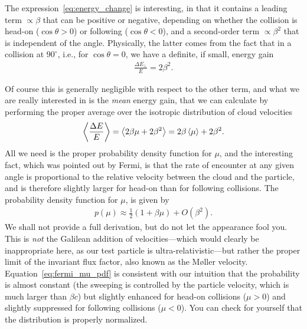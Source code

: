 The expression~\eqref{eq:energy_change} is interesting, in that it contains a leading
term $\propto \beta$ that can be positive or negative, depending on whether the
collision is head-on ($\cos\theta > 0$) or following ($\cos\theta < 0$), and a
second-order term $\propto \beta^2$ that is independent of the angle.  Physically,
the latter comes from the fact that in a collision at $90^\circ$, i.e., for
$\cos\theta = 0$, we have a definite, if small, energy gain
\begin{align*}
  \frac{\Delta E_\perp}{E} = 2\beta^2.
\end{align*}

Of course this is generally negligible with respect to the other term, and what we
are really interested in is the \emph{mean} energy gain, that we can calculate by
performing the proper average over the isotropic distribution of cloud velocities
\begin{align*}
  \left<\frac{\Delta E}{E}\right> = \left<2\beta \mu + 2\beta^2\right> = 2\beta \left<\mu\right> + 2\beta^2.
\end{align*}
All we need is the proper probability density function for $\mu$, and the interesting
fact, which was pointed out by Fermi, is that the rate of encounter at any given angle
is proportional to the relative velocity between the cloud and the particle, and is
therefore slightly larger for head-on than for following collisions. The probability density function for $\mu$, is
given by
\begin{align}\label{eq:fermi_mu_pdf}
  p(\mu) \approx \frac{1}{2} (1 + \beta \mu)  + O(\beta^2).
\end{align}
We shall not provide a full derivation, but do not let the appearance fool you.
This is \emph{not} the Galilean addition of velocities---which would clearly be
inappropriate here, as our test particle is ultra-relativistic---but rather the
proper limit of the invariant flux factor, also known as the Møller velocity.
Equation~\eqref{eq:fermi_mu_pdf} is consistent with our intuition that the
probability is almost constant (the sweeping is controlled by the particle velocity,
which is much larger than $\beta c$) but slightly enhanced for head-on collisions
($\mu > 0$) and slightly suppressed for following collisions ($\mu < 0$). You can
check for yourself that the distribution is properly normalized.

